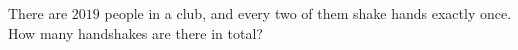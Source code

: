 There are $2019$ people in a club, and every two of them shake hands exactly once. How many handshakes are there in total?
